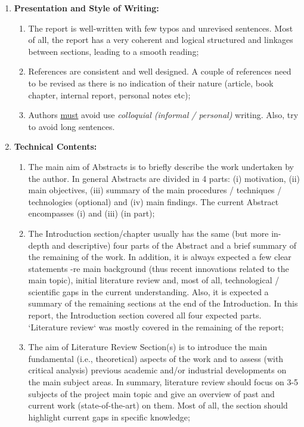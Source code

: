 \documentclass[14pt,twoside]{report}
\begin{document}
\begin{enumerate}
%
    \item {\bf Presentation and Style of Writing:}
                \begin{enumerate}
                   \item The report is well-written with few typos and unrevised sentences. Most of all, the report has a very coherent and logical structured and linkages between sections, leading to a smooth reading;
                   \item References are consistent and well designed. A couple of references need to be revised as there is no indication of their nature (article, book chapter, internal report, personal notes etc); 
                   \item Authors \underline{must} avoid use {\it colloquial (informal / personal)} writing. Also, try to avoid long sentences.
                \end{enumerate}
%
    \item {\bf Technical Contents:}
                \begin{enumerate}
                   \item The main aim of Abstracts is to briefly describe the work undertaken by the author. In general Abstracts are divided in 4 parts: (i) motivation, (ii) main objectives, (iii) summary of the main procedures / techniques / technologies (optional) and (iv) main findings. The current Abstract encompasses (i) and (iii) (in part);
                   \item The Introduction section/chapter usually has the same (but more in-depth and descriptive) four parts of the Abstract and a brief summary of the remaining of the work. In addition, it is always expected a few clear statements -re main background (thus recent innovations related to the main topic), initial literature review and, most of all, technological / scientific gaps in the current understanding. Also, it is expected a summary of the remaining sections at the end of the Introduction. In this report, the Introduction section covered all four expected parts. `Literature review` was mostly covered in the remaining of the report; 
                   \item The aim of Literature Review Section(s) is to introduce the main fundamental (i.e., theoretical) aspects of the work and to assess (with critical analysis) previous academic and/or industrial developments on the main subject areas. In summary, literature review should focus on 3-5 subjects of the project main topic and give an overview of past and current work (state-of-the-art) on them. Most of all, the section should highlight current gaps in specific knowledge;
                     

\end{enumerate}
\end{enumerate}
\end{document}
